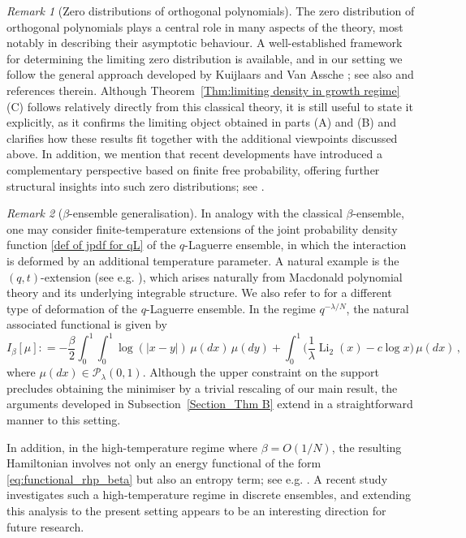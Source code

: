 \documentclass{amsart}
\newcommand{\Li}{\operatorname{Li}}
\theoremstyle{plain}
\theoremstyle{remark}
\newtheorem{rem}{Remark}
\numberwithin{equation}{section}
\begin{document}
\begin{rem}[Zero distributions of orthogonal polynomials] 
The zero distribution of orthogonal polynomials plays a central role in many aspects of the theory, most notably in describing their asymptotic behaviour. A well-established framework for determining the limiting zero distribution is available, and in our setting we follow the general approach developed by Kuijlaars and Van Assche \cite{KV99}; see also \cite{Ha18} and references therein. 
Although Theorem~\ref{Thm:limiting density in growth regime} (C) follows relatively directly from this classical theory, it is still useful to state it explicitly, as it confirms the limiting object obtained in parts (A) and (B) and clarifies how these results fit together with the additional viewpoints discussed above.
In addition, we mention that recent developments have introduced a complementary perspective 
based on finite free probability, offering further structural insights into such zero distributions; see \cite{JKM25,JKM25a}. 
\end{rem}

\begin{rem}[$\beta$-ensemble generalisation]
In analogy with the classical $\beta$-ensemble, one may consider
finite-temperature extensions of the joint probability density function
\eqref{def of jpdf for qL} of the $q$-Laguerre ensemble, in which the
interaction is deformed by an additional temperature parameter.
A natural example is the $(q,t)$-extension (see e.g. \cite{Ol21,BF25a}), which arises naturally from Macdonald polynomial theory and its underlying integrable structure. We also refer to \cite{HMO25} for a different type of deformation of the $q$-Laguerre ensemble.
In the regime $q^{-\lambda/N}$, the natural associated functional is given by 
    \begin{equation}
    \label{eq:functional_rhp_beta}
        I_\beta[\mu] : = - \frac{\beta}{2}\int_{0}^{1}\int_{0}^{1} \log(|x-y|)\, \mu(dx) \, \mu(dy)  + \int_0^1 \Big( \frac{1}{\lambda}\Li_2(x)-c \log x \Big)\, \mu(dx)\,,
    \end{equation}
where $\mu(dx)\in\mathcal{P}_{\lambda}(0,1)$.
Although the upper constraint on the support precludes obtaining the
minimiser by a trivial rescaling of our main result, the arguments developed in Subsection~\ref{Section_Thm B} extend in a straightforward manner to this setting. 

In addition, in the high-temperature regime where $\beta = O(1/N)$, the resulting Hamiltonian involves not only an energy functional of the form \eqref{eq:functional_rhp_beta} but also an entropy term; see e.g.  \cite{ABG12,ABMV12}. A recent study \cite{CD25} investigates such a high-temperature regime in discrete ensembles, and extending this analysis to the present setting appears to be an interesting direction for future research. 
\end{rem} 
\end{document}
